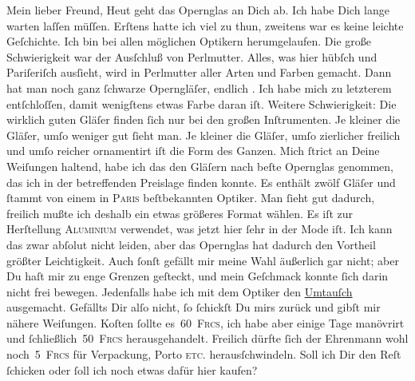 \pstart\center{}Mein lieber Freund,\pend\vspace{0.5em}
\pstart
           Heut geht das Opernglas an Dich ab. Ich habe Dich
               lange warten laſſen müſſen. Erſtens hatte ich viel zu thun, zweitens war es keine
               leichte Geſchichte. Ich bin bei allen möglichen Optikern herumgelaufen. Die große
               Schwierigkeit war der Ausſchluß von Perlmutter. Alles, was hier hübſch und Pariſeriſch ausſieht, wird in Perlmutter aller
               Arten und Farben gemacht. Dann hat man noch ganz ſchwarze {\pb}Operngläſer, endlich \label{K_L02762-1v}\label{K_L02762-1}. Ich habe mich zu letzterem entſchloſſen, damit wenigſtens
               etwas Farbe daran iſt. Weitere Schwierigkeit: Die wirklich guten Gläſer finden ſich
               nur bei den großen Inſtrumenten. Je kleiner die Gläſer, umſo weniger gut ſieht man.
               Je kleiner die Gläſer, umſo zierlicher freilich und umſo reicher ornamentirt iſt die
               Form des Ganzen. Mich ſtrict an Deine Weiſungen haltend, habe ich das den Gläſern {\pb}nach beſte Opernglas genommen, das ich in  der betreffenden Preislage finden konnte. Es enthält
               zwölf Gläſer und ſtammt von einem in \textsc{Paris} beſtbekannten Optiker.  Man
               ſieht gut dadurch, freilich mußte ich deshalb ein etwas größeres Format wählen. Es
               iſt zur Herſtellung \textsc{Aluminium} verwendet, was jetzt hier
               ſehr in der Mode iſt. Ich kann das zwar abſolut nicht leiden, aber das Opernglas hat
               dadurch den Vortheil {\pb}größter Leichtigkeit. Auch
               ſonſt gefällt mir meine Wahl äußerlich gar nicht; 
               aber Du haſt mir zu enge Grenzen geſteckt, und mein Geſchmack konnte ſich darin nicht
               frei bewegen. Jedenfalls habe ich mit dem Optiker den \uline{Umtauſch} ausgemacht. Gefällts Dir alſo nicht, ſo ſchickſt Du mirs zurück und
               gibſt mir nähere Weiſungen. Koſten ſollte es 60 \textsc{Frcs}, ich
               habe aber einige Tage {\pb}manövrirt und
                  ſchließlich 50 \textsc{Frcs} herausgehandelt. Freilich dürfte
               ſich der Ehrenmann wohl noch 5 \textsc{Frcs} für Verpackung, Porto
                  \textsc{etc.} herausſchwindeln. Soll ich Dir den Reſt ſchicken
               oder ſoll ich noch etwas dafür hier kaufen?\pend
           
